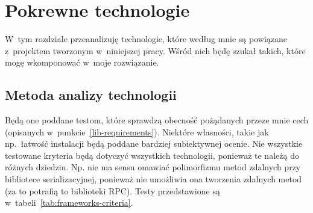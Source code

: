 
\chapter{Pokrewne technologie}
\label{similar-technologies}
W~tym rozdziale przeanalizuję technologie, które według mnie są powiązane z~projektem tworzonym w~niniejszej pracy.
Wśród nich będę szukał takich, które mogę wkomponować w~moje rozwiązanie.

\section{Metoda analizy technologii}
Będą one poddane testom, które sprawdzą obecność pożądanych przeze mnie cech (opisanych w~punkcie~\ref{lib-requirements}).
Niektóre własności, takie jak np.\ łatwość instalacji będą poddane bardziej subiektywnej ocenie.
Nie wszystkie testowane kryteria będą dotyczyć wszystkich technologii, ponieważ te należą do różnych dziedzin.
Np. nie ma sensu omawiać polimorfizmu metod zdalnych przy bibliotece serializacyjnej, ponieważ nie umożliwia ona tworzenia zdalnych metod (za to potrafią to biblioteki RPC).
Testy przedstawione są w~tabeli~\ref{tab:frameworks-criteria}.

